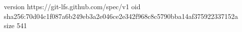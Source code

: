 version https://git-lfs.github.com/spec/v1
oid sha256:70d04c1f087a6b249eb3a2e046ce2e342f968c8c5790bba14af375922337152a
size 541
